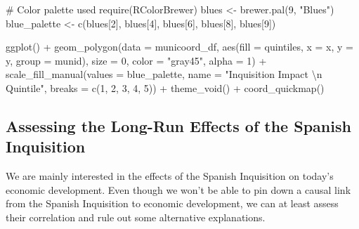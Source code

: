 \documentclass[
]{report}
\newenvironment{Shaded}{\begin{snugshade}}{\end{snugshade}}
\newcommand{\AttributeTok}[1]{\textcolor[rgb]{0.40,0.45,0.13}{#1}}
\newcommand{\CommentTok}[1]{\textcolor[rgb]{0.37,0.37,0.37}{#1}}
\newcommand{\DecValTok}[1]{\textcolor[rgb]{0.68,0.00,0.00}{#1}}
\newcommand{\FunctionTok}[1]{\textcolor[rgb]{0.28,0.35,0.67}{#1}}
\newcommand{\NormalTok}[1]{\textcolor[rgb]{0.00,0.23,0.31}{#1}}
\newcommand{\OtherTok}[1]{\textcolor[rgb]{0.00,0.23,0.31}{#1}}
\newcommand{\SpecialCharTok}[1]{\textcolor[rgb]{0.37,0.37,0.37}{#1}}
\newcommand{\StringTok}[1]{\textcolor[rgb]{0.13,0.47,0.30}{#1}}
\begin{document}
\begin{Shaded}
\begin{Highlighting}[]
\CommentTok{\# Color palette used }
\FunctionTok{require}\NormalTok{(RColorBrewer)}
\NormalTok{blues }\OtherTok{\textless{}{-}} \FunctionTok{brewer.pal}\NormalTok{(}\DecValTok{9}\NormalTok{, }\StringTok{"Blues"}\NormalTok{)}
\NormalTok{blue\_palette }\OtherTok{\textless{}{-}} \FunctionTok{c}\NormalTok{(blues[}\DecValTok{2}\NormalTok{], blues[}\DecValTok{4}\NormalTok{], blues[}\DecValTok{6}\NormalTok{], blues[}\DecValTok{8}\NormalTok{], blues[}\DecValTok{9}\NormalTok{])}

\FunctionTok{ggplot}\NormalTok{() }\SpecialCharTok{+} 
  \FunctionTok{geom\_polygon}\NormalTok{(}\AttributeTok{data =}\NormalTok{ municoord\_df, }\FunctionTok{aes}\NormalTok{(}\AttributeTok{fill =}\NormalTok{ quintiles, }
               \AttributeTok{x =}\NormalTok{ x, }\AttributeTok{y =}\NormalTok{ y, }\AttributeTok{group =}\NormalTok{ munid), }
               \AttributeTok{size =} \DecValTok{0}\NormalTok{, }\AttributeTok{color =} \StringTok{"gray45"}\NormalTok{, }\AttributeTok{alpha =} \DecValTok{1}\NormalTok{) }\SpecialCharTok{+} 
  \FunctionTok{scale\_fill\_manual}\NormalTok{(}\AttributeTok{values =}\NormalTok{ blue\_palette, }\AttributeTok{name =} \StringTok{"Inquisition Impact }\SpecialCharTok{\textbackslash{}n}\StringTok{ Quintile"}\NormalTok{, }
                    \AttributeTok{breaks =} \FunctionTok{c}\NormalTok{(}\DecValTok{1}\NormalTok{, }\DecValTok{2}\NormalTok{, }\DecValTok{3}\NormalTok{, }\DecValTok{4}\NormalTok{, }\DecValTok{5}\NormalTok{)) }\SpecialCharTok{+}
  \FunctionTok{theme\_void}\NormalTok{() }\SpecialCharTok{+} 
  \FunctionTok{coord\_quickmap}\NormalTok{()}
\end{Highlighting}
\end{Shaded}

\subsection{Assessing the Long-Run Effects of the Spanish Inquisition}

We are mainly interested in the effects of the Spanish Inquisition on
today's economic development. Even though we won't be able to pin down a
causal link from the Spanish Inquisition to economic development, we can
at least assess their correlation and rule out some alternative
explanations.
\end{document}
